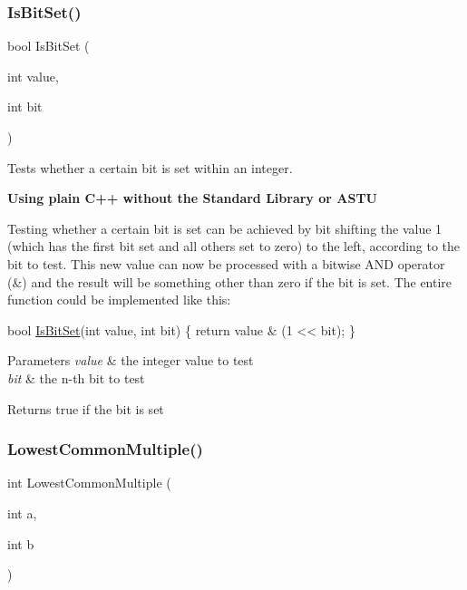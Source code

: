 \subsubsection{\texorpdfstring{Is\+Bit\+Set()}{IsBitSet()}}
{\footnotesize\ttfamily bool Is\+Bit\+Set (\begin{DoxyParamCaption}\item[{int}]{value,  }\item[{int}]{bit }\end{DoxyParamCaption})}

Tests whether a certain bit is set within an integer.

{\bfseries Using plain C++ without the Standard Library or A\+S\+TU}

Testing whether a certain bit is set can be achieved by bit shifting the value 1 (which has the first bit set and all others set to zero) to the left, according to the bit to test. This new value can now be processed with a bitwise A\+ND operator (\&) and the result will be something other than zero if the bit is set. The entire function could be implemented like this\+:


\begin{DoxyCode}
\textcolor{keywordtype}{bool} \hyperlink{group__math__group_ga1fbbb8c0c7c30db6995b5a4fa82e1754}{IsBitSet}(\textcolor{keywordtype}{int} value, \textcolor{keywordtype}{int} bit)
\{
  \textcolor{keywordflow}{return} value & (1 << bit);
\}
\end{DoxyCode}



\begin{DoxyParams}{Parameters}
{\em value} & the integer value to test \\
\hline
{\em bit} & the n-\/th bit to test \\
\hline
\end{DoxyParams}
\begin{DoxyReturn}{Returns}
{\ttfamily true} if the bit is set 
\end{DoxyReturn}
\mbox{\label{group__math__group_ga322fe1f4e7738ff3234fe70d04daeafe}} 
\subsubsection{\texorpdfstring{Lowest\+Common\+Multiple()}{LowestCommonMultiple()}}
{\footnotesize\ttfamily int Lowest\+Common\+Multiple (\begin{DoxyParamCaption}\item[{int}]{a,  }\item[{int}]{b }\end{DoxyParamCaption})}

